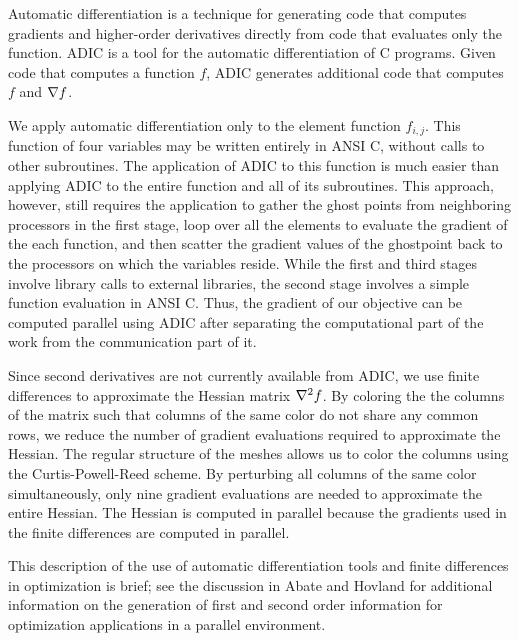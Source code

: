 Automatic differentiation \cite{AG00,Corliss2001b} is a
technique for generating code that computes gradients and
higher-order derivatives directly from code that
evaluates only the function.  ADIC
\cite{ADIC,adic-home} is a tool for the automatic
differentiation of C programs.  Given code that computes a
function $f$, ADIC generates additional code that computes
$f$ and $ \nabla f $.


We apply automatic differentiation only to
the element function $f_{i,j}$.  This function of four
variables may be written entirely in ANSI C, 
without calls to other subroutines.  The application of ADIC to this
function is much easier than applying ADIC to the
entire function and all of its subroutines.
This approach, however, still requires the application to
gather the ghost points from neighboring processors in the
first stage, loop over all the elements to
evaluate the gradient of the each function, and then scatter
the gradient values of the ghostpoint back to the processors
on which the variables reside.  While the first and third
stages involve library calls to external libraries, the
second stage involves a simple function evaluation in ANSI
C.  Thus, the gradient of our objective can be computed
parallel using ADIC after separating the computational part
of the work from the communication part of it.

Since second derivatives are not currently available from ADIC, 
we use finite differences to approximate the Hessian matrix 
$\nabla^2 f$.  By 
coloring the the columns of the matrix such that columns of 
the same color do not share any common rows, we reduce the
number of gradient evaluations required to approximate the
Hessian.  The regular structure of the meshes allows us to 
color the columns using the
Curtis-Powell-Reed \cite{Curtis1974OtE} scheme.
By perturbing all columns of the same color simultaneously,
only nine gradient evaluations are needed to approximate 
the entire Hessian.  The Hessian is computed in parallel because
the gradients used in the finite differences are computed in parallel.

This description of the use of automatic
differentiation tools and finite differences in optimization is brief;
see the discussion in Abate \cite {AD2K-JA00} 
and Hovland \cite {PH03} for additional information on
the generation of first and second order information for
optimization applications in a parallel environment.

